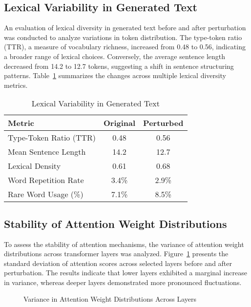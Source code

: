 \documentclass[5p,times]{elsarticle}
\begin{document}
\subsection{Lexical Variability in Generated Text}

An evaluation of lexical diversity in generated text before and after perturbation was conducted to analyze variations in token distribution. The type-token ratio (TTR), a measure of vocabulary richness, increased from 0.48 to 0.56, indicating a broader range of lexical choices. Conversely, the average sentence length decreased from 14.2 to 12.7 tokens, suggesting a shift in sentence structuring patterns. Table~\ref{tab:lexical} summarizes the changes across multiple lexical diversity metrics.

\begin{table}[ht]
	\centering
	\begin{tabular}{lcc}
		\hline
		\textbf{Metric} & \textbf{Original} & \textbf{Perturbed} \\
		\hline
		Type-Token Ratio (TTR) & 0.48 & 0.56 \\
		Mean Sentence Length & 14.2 & 12.7 \\
		Lexical Density & 0.61 & 0.68 \\
		Word Repetition Rate & 3.4\% & 2.9\% \\
		Rare Word Usage (\%) & 7.1\% & 8.5\% \\
		\hline
	\end{tabular}
	\caption{Lexical Variability in Generated Text}
	\label{tab:lexical}
\end{table}

\subsection{Stability of Attention Weight Distributions}

To assess the stability of attention mechanisms, the variance of attention weight distributions across transformer layers was analyzed. Figure~\ref{fig:attention_variance} presents the standard deviation of attention scores across selected layers before and after perturbation. The results indicate that lower layers exhibited a marginal increase in variance, whereas deeper layers demonstrated more pronounced fluctuations.

\begin{figure}[ht]
	\centering
	\caption{Variance in Attention Weight Distributions Across Layers}
	\label{fig:attention_variance}
\end{figure}
\end{document}
